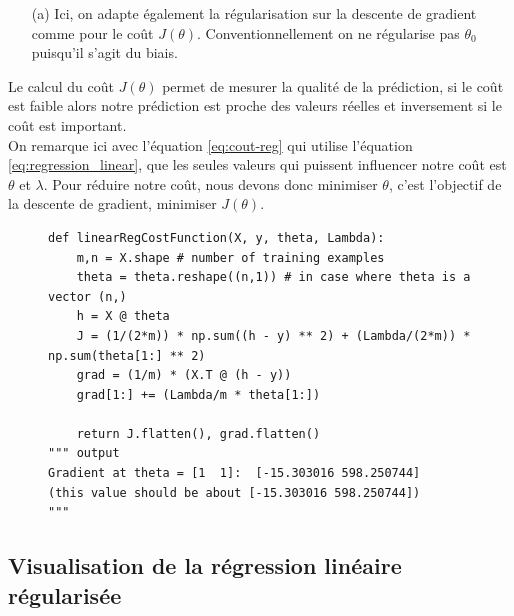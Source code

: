 \begin{itemize}
    \item [(a)] Ici, on adapte également la régularisation sur la descente de gradient comme pour le coût $J(\theta)$. Conventionnellement on ne régularise pas $\theta_0$
    puisqu'il s'agit du biais.
\end{itemize}

\vspace{0.5cm}


Le calcul du coût $J(\theta)$ permet de mesurer la qualité de la prédiction, si le coût est faible alors notre prédiction est proche des valeurs réelles et inversement si le coût est important. \\
On remarque ici avec l'équation \ref{eq:cout-reg} qui utilise l'équation \ref{eq:regression_linear}, que les seules valeurs qui puissent influencer notre coût est $\theta$ et $\lambda$. Pour réduire notre coût, nous devons donc minimiser $\theta$, c'est l'objectif
de la descente de gradient, minimiser $J(\theta)$.

\vspace{0.2cm}

\begin{figure}[!h]
\begin{verbatim}
def linearRegCostFunction(X, y, theta, Lambda):
    m,n = X.shape # number of training examples
    theta = theta.reshape((n,1)) # in case where theta is a vector (n,) 
    h = X @ theta
    J = (1/(2*m)) * np.sum((h - y) ** 2) + (Lambda/(2*m)) * np.sum(theta[1:] ** 2)
    grad = (1/m) * (X.T @ (h - y))
    grad[1:] += (Lambda/m * theta[1:])

    return J.flatten(), grad.flatten()
""" output
Gradient at theta = [1  1]:  [-15.303016 598.250744] 
(this value should be about [-15.303016 598.250744])
"""
\end{verbatim}   
\end{figure}




\subsection{Visualisation de la régression linéaire régularisée}

